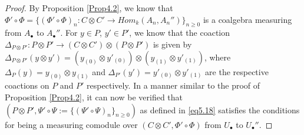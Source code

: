 \documentclass[10pt, colorlinks]{article}
\numberwithin{equation}{section} \DeclareMathSizes{2}{10}{12}{13}
\begin{document}
\begin{proof}
By Proposition \ref{Prop4.2}, we know that  $\Phi'\circ \Phi=\{(\Phi'\circ \Phi)_n:C\otimes C'\longrightarrow Hom_k(A_n,A_n'')\}_{n\geq 0}$ is a coalgebra measuring from $A_\bullet$ to $A_\bullet''$. For $y\in P$, $y'\in P'$, we know that the coaction $\Delta_{P\otimes P'}:P\otimes P'\longrightarrow (C\otimes C')
\otimes (P\otimes P')$  is given by  $\Delta_{P\otimes P'}(y\otimes y')=(y_{(0)}\otimes y'_{(0)})\otimes (y_{(1)}\otimes y'_{(1)})$, where $\Delta_P(y)=y_{(0)}\otimes y_{(1)}$ and $\Delta_{P'}(y')=y'_{(0)}\otimes y'_{(1)}$ are the respective coactions on $P$ and $P'$ respectively. In a manner similar to the proof of 
Proposition \ref{Prop4.2}, it can now be verified that $(P\otimes P',\Psi'\circ \Psi:=\{(\Psi'\circ \Psi)_n\}_{n\geq 0})$ as defined in \eqref{eq5.18} satisfies the conditions for being a measuring comodule over $(C\otimes C',\Phi'\circ \Phi)$ from $U_\bullet$ to $U_\bullet''$.  

\end{proof}
\end{document}
